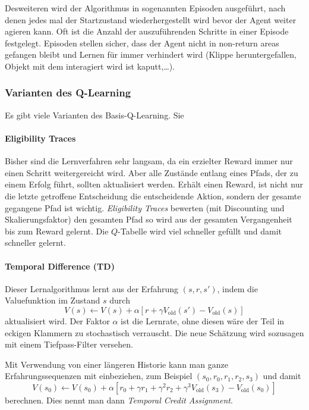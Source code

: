 Desweiteren wird der Algorithmus in sogenannten Episoden ausgeführt, nach denen jedes mal der Startzustand wiederhergestellt wird bevor der Agent weiter agieren kann. Oft ist die Anzahl der auszuführenden Schritte in einer Episode festgelegt. Episoden stellen sicher, dass der Agent nicht in non-return areas gefangen bleibt und Lernen für immer verhindert wird (Klippe heruntergefallen, Objekt mit dem interagiert wird ist kaputt,\ldots).

\subsubsection{Varianten des Q-Learning}
Es gibt viele Varianten des Basis-Q-Learning. Sie
\paragraph{Eligibility Traces}
Bisher sind die Lernverfahren sehr langsam, da ein erzielter Reward immer nur einen Schritt  weitergereicht wird.
Aber alle Zustände entlang eines Pfads, der zu einem Erfolg führt, sollten aktualisiert werden. Erhält einen Reward, ist nicht nur die letzte getroffene Entscheidung die entscheidende Aktion, sondern der gesamte gegangene Pfad ist wichtig.
\emph{Eligibility Traces} bewerten (mit Discounting und Skalierungsfaktor) den gesamten Pfad so wird aus der gesamten Vergangenheit bis zum Reward gelernt. Die $Q$-Tabelle wird viel schneller gefüllt und damit schneller gelernt.


\paragraph{Temporal Difference (TD)}
Dieser Lernalgorithmus lernt aus der Erfahrung $(s,r,s')$, indem die Valuefunktion im Zustand $s$ durch
\begin{equation*}
	V(s)\leftarrow V(s)+\alpha [r+\gamma V_{\text{old}}(s')-V_{\text{old}}(s)]
\end{equation*}
aktualisiert wird. Der Faktor $\alpha$ ist die Lernrate, ohne diesen wäre der Teil in eckigen Klammern zu stochastisch verrauscht. Die neue Schätzung wird sozusagen mit einem Tiefpass-Filter versehen.

Mit Verwendung von einer längeren Historie kann man ganze Erfahrungssequenzen mit einbeziehen, zum Beispiel $(s_0,r_0,r_1,r_2,s_3)$ und damit
\begin{equation*}
	V(s_0)\leftarrow V(s_0)+\alpha [r_0+\gamma r_1+\gamma^2r_2+\gamma^3 V_{\text{old}}(s_3)-V_{\text{old}}(s_0)]
\end{equation*}
berechnen. Dies nennt man dann \emph{Temporal Credit Assignment}.

